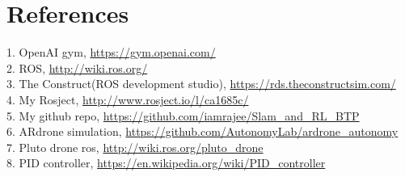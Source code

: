 \newpage
\chapter*{References}
1. OpenAI gym,  \url{https://gym.openai.com/}
\\2. ROS,  \url{http://wiki.ros.org/}
\\3. The Construct(ROS development studio), \url{https://rds.theconstructsim.com/}
\\4. My Rosject,  \url{http://www.rosject.io/l/ca1685c/}
\\5. My github repo,  \url{https://github.com/iamrajee/Slam_and_RL_BTP}
\\6. ARdrone simulation,  \url{https://github.com/AutonomyLab/ardrone_autonomy}
\\7. Pluto drone ros,  \url{http://wiki.ros.org/pluto_drone}
\\8. PID controller,  \url{https://en.wikipedia.org/wiki/PID_controller}



